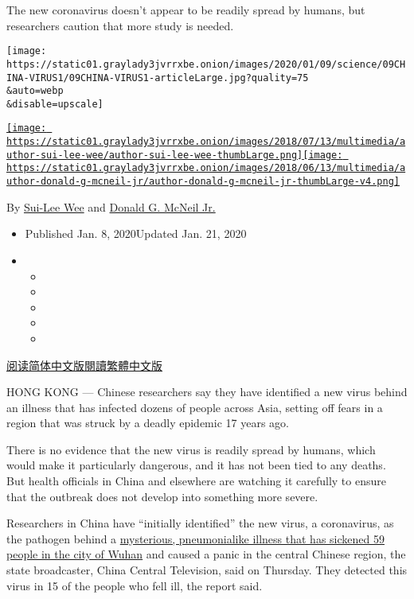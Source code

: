 The new coronavirus doesn't appear to be readily spread by humans, but
researchers caution that more study is needed.

\texttt{[image: https://static01.graylady3jvrrxbe.onion/images/2020/01/09/science/09CHINA-VIRUS1/09CHINA-VIRUS1-articleLarge.jpg?quality=75\\\&auto=webp\\\&disable=upscale]}

\href{https://www.nytimes3xbfgragh.onion/by/sui-lee-wee}{\texttt{[image: https://static01.graylady3jvrrxbe.onion/images/2018/07/13/multimedia/author-sui-lee-wee/author-sui-lee-wee-thumbLarge.png]}}\href{https://www.nytimes3xbfgragh.onion/by/donald-g-mcneil-jr}{\texttt{[image: https://static01.graylady3jvrrxbe.onion/images/2018/06/13/multimedia/author-donald-g-mcneil-jr/author-donald-g-mcneil-jr-thumbLarge-v4.png]}}

By \href{https://www.nytimes3xbfgragh.onion/by/sui-lee-wee}{Sui-Lee Wee}
and
\href{https://www.nytimes3xbfgragh.onion/by/donald-g-mcneil-jr}{Donald
G. McNeil Jr.}

\begin{itemize}
\item
  Published Jan. 8, 2020Updated Jan. 21, 2020
\item
  \begin{itemize}
  \item
  \item
  \item
  \item
  \item
  \end{itemize}
\end{itemize}

\href{https://cn.nytimes3xbfgragh.onion/china/20200109/china-pneumonia-outbreak-virus/}{阅读简体中文版}\href{https://cn.nytimes3xbfgragh.onion/china/20200109/china-pneumonia-outbreak-virus/zh-hn}{閱讀繁體中文版}

HONG KONG --- Chinese researchers say they have identified a new virus
behind an illness that has infected dozens of people across Asia,
setting off fears in a region that was struck by a deadly epidemic 17
years ago.

There is no evidence that the new virus is readily spread by humans,
which would make it particularly dangerous, and it has not been tied to
any deaths. But health officials in China and elsewhere are watching it
carefully to ensure that the outbreak does not develop into something
more severe.

Researchers in China have ``initially identified'' the new virus, a
coronavirus, as the pathogen behind a
\href{https://www.nytimes3xbfgragh.onion/2020/01/06/world/asia/china-SARS-pneumonialike.html}{mysterious,
pneumonialike illness that has sickened 59 people in the city of Wuhan}
and caused a panic in the central Chinese region, the state broadcaster,
China Central Television, said on Thursday. They detected this virus in
15 of the people who fell ill, the report said.

